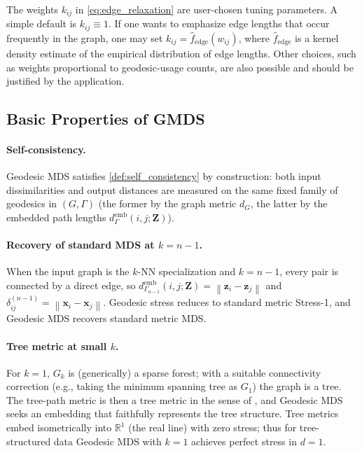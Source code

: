 \documentclass[twoside,11pt]{article}
\newcommand{\R}{\mathbb{R}}
\newcommand{\bx}{\mathbf{x}}
\newcommand{\bz}{\mathbf{z}}
\newcommand{\bZ}{\mathbf{Z}}
\newcommand{\norm}[1]{\left\|#1\right\|}
\newcommand{\demb}{d^{\mathrm{emb}}}
\newcommand{\Gk}{G_k}
\begin{document}
The weights $k_{ij}$ in \cref{eq:edge_relaxation} are user-chosen tuning
parameters.  A simple default is $k_{ij} \equiv 1$.  If one wants to emphasize
edge lengths that occur frequently in the graph, one may set
$k_{ij} = \hat f_{\mathrm{edge}}(w_{ij})$, where
$\hat f_{\mathrm{edge}}$ is a kernel density estimate of the empirical
distribution of edge lengths.  Other choices, such as weights proportional to
geodesic-usage counts, are also possible and should be justified by the
application.

\subsection{Basic Properties of GMDS}
\label{sec:properties}

\paragraph{Self-consistency.}
Geodesic MDS satisfies \cref{def:self_consistency} by construction:
both input dissimilarities and output distances are measured on the same
fixed family of geodesics in $(G,\Gamma)$ (the former by the graph
metric $d_G$, the latter by the embedded path lengths
$\demb_{\Gamma}(i,j;\bZ)$).

\paragraph{Recovery of standard MDS at $k = n-1$.}
When the input graph is the $k$-NN specialization and $k = n-1$, every
pair is connected by a direct edge, so
$\demb_{\Gamma_{n-1}}(i,j;\bZ) = \norm{\bz_i - \bz_j}$ and
$\delta^{(n-1)}_{ij} = \norm{\bx_i - \bx_j}$.  Geodesic stress reduces to
standard metric Stress-1, and Geodesic MDS recovers standard metric MDS.

\paragraph{Tree metric at small $k$.}
For $k = 1$, $\Gk$ is (generically) a sparse forest; with a suitable
connectivity correction (e.g., taking the minimum spanning tree as
$G_1$) the graph is a tree.  The tree-path metric is then a tree metric in
the sense of \citet{dress1984trees}, and Geodesic MDS seeks an
embedding that faithfully represents the tree structure.  Tree metrics
embed isometrically into $\R^1$ (the real line) with zero stress;
thus for tree-structured data Geodesic MDS with $k=1$ achieves
perfect stress in $d=1$.
\end{document}
